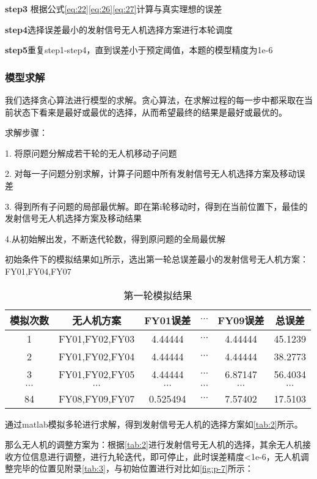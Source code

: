 \documentclass{cumcmthesis}
\begin{document}
\textbf{step3} 根据公式\cref{eq:22}\cref{eq:26}\cref{eq:27}计算与真实理想的误差

\textbf{step4}选择误差最小的发射信号无人机选择方案进行本轮调度

\textbf{step5}重复step1-step4，直到误差小于预定阈值，本题的模型精度为1e-6

\subsubsection{模型求解}
我们选择贪心算法进行模型的求解。贪心算法，在求解过程的每一步中都采取在当前状态下看来是最好或最优的选择，从而希望最终的结果是最好或最优的。

求解步骤：

1. 将原问题分解成若干轮的无人机移动子问题

2. 对每一子问题分别求解，计算子问题中所有发射信号无人机选择方案及移动误差

3. 得到所有子问题的局部最优解。即在第i轮移动时，得到在当前位置下，最佳的发射信号无人机选择方案及移动结果

4.从初始解出发，不断迭代轮数，得到原问题的全局最优解

初始条件下的模拟结果如\cref{tab:1}所示，选出第一轮总误差最小的发射信号无人机方案：FY01,FY04,FY07
\begin{table}[!htbp]
	\caption{第一轮模拟结果}\label{tab:1} \centering
	\begin{tabular}{cccccc}
		\toprule[1.5pt]
		模拟次数 & 无人机方案 & FY01误差 & $\cdots$ & FY09误差 & 总误差\\
		\midrule[1pt]
		1 & FY01,FY02,FY03 & 4.44444 & 	$\cdots$ & 4.44444 & 45.1239\\
		2 & FY01,FY02,FY04 & 4.44444 & 	$\cdots$ &4.44444&38.2773 \\
		3 & FY01,FY02,FY05 & 4.44444 & 	$\cdots$ & 6.87147& 56.4034\\
		$\cdots$ & $\cdots$ & $\cdots$ & $\cdots$ & $\cdots$ & $\cdots$\\
		84 & FY08,FY09,FY07 & 0.525494 & 	$\cdots$ & 7.57402& 17.5103\\
		\bottomrule[1.5pt]
	\end{tabular}
\end{table}

通过matlab模拟多轮进行求解，得到发射信号无人机的选择方案如\cref{tab:2}所示。

那么无人机的调整方案为：根据\cref{tab:2}进行发射信号无人机的选择，其余无人机接收方位信息进行调整，进行九轮迭代，即可停止，此时误差精度<1e-6，无人机调整完毕的位置见附录\cref{tab:3}，与初始位置进行对比如\cref{fig:p-7}所示：
	
\end{document}
